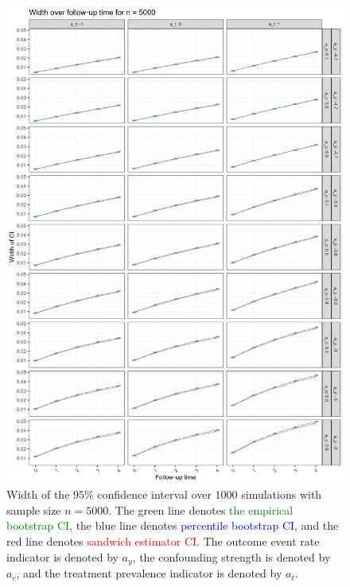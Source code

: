 \documentclass[pdflatex,sn-vancouver-ay]{sn-jnl}%
\theoremstyle{thmstyleone}%
\theoremstyle{thmstyletwo}%
\theoremstyle{thmstylethree}%
\begin{document}
\begin{appendices}
\begin{figure}[H]
\centering
\includegraphics[height=0.95\textheight]{plots/plots_width5000.png}
\caption{Width of the $95\%$ confidence interval over $1000$ simulations with sample size $n = 5000$. The green line denotes \textcolor{green}{the empirical bootstrap CI}, the blue line denotes \textcolor{blue}{percentile bootstrap CI}, and the red line denotes \textcolor{red}{sandwich estimator CI}. The outcome event rate indicator is denoted by $a_y$, the confounding strength is denoted by $a_c$, and the treatment prevalence indicator is denoted by $a_t$.}\label{plt:width5000}
\end{figure}

\newpage


\end{appendices}
\end{document}
